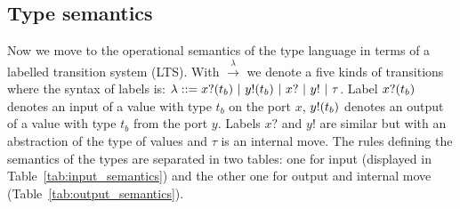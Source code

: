 \subsection{Type semantics}
\vspace{0.5cm}

Now we move to the operational semantics of the type language in terms of a labelled transition system (LTS). With $\xrightarrow{\text{$\lambda$}}$ we denote a five kinds of transitions where the syntax of labels is: $\lambda::=\depen{x?}{t_b}\ |\ \depen{y!}{t_b}\ |\ x?\ |\ y!\ |\ \tau$. Label $x?(t_b)$ denotes an input of a value with type $t_b$ on the port $x$, $y!(t_b)$ denotes an output of a value with type $t_b$ from the port $y$. Labels $x?$ and $y!$ are similar but with an abstraction of the type of values and $\tau$ is an internal move. The rules defining the semantics of the types are separated in two tables: one for input  (displayed in Table~\ref{tab:input_semantics}) and the other one for output and internal move (Table~\ref{tab:output_semantics}). 









